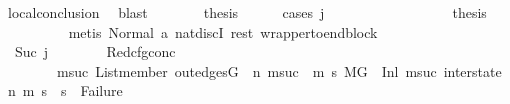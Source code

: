 \begin{isabellebody}
\ local{\isacharunderscore}{\kern0pt}conclusion\ \isamarkupfalse%
\ blast\isanewline
\ \ \ \ \isamarkupfalse%
\ \isamarkupfalse%
\ {\isacharquery}{\kern0pt}thesis\isanewline
\ \ \ \ \isamarkupfalse%
\ {\isacharparenleft}{\kern0pt}cases\ j{\isacharprime}{\kern0pt}{\isacharparenright}{\kern0pt}\isanewline
\ \ \ \ \ \ \isamarkupfalse%
\ {}\isanewline
\ \ \ \ \ \ \isamarkupfalse%
\ \isamarkupfalse%
\ {\isacharquery}{\kern0pt}thesis\ \isanewline
\ \ \ \ \ \ \ \ \isamarkupfalse%
\ {\isacharparenleft}{\kern0pt}metis\ Normal\ a{}\ nat{\isachardot}{\kern0pt}discI\ rest\ wrapper{\isacharunderscore}{\kern0pt}to{\isacharunderscore}{\kern0pt}endblock{\isacharparenright}{\kern0pt}\isanewline
\ \ \ \ \isamarkupfalse%
\isanewline
\ \ \ \ \ \ \isamarkupfalse%
\ {}{\isacharcolon}{\kern0pt}\ {\isacharparenleft}{\kern0pt}Suc\ j{\isacharprime}{\kern0pt}{\isacharprime}{\kern0pt}{\isacharparenright}{\kern0pt}\isanewline
\ \ \ \ \ \ \isamarkupfalse%
\ Red{\isacharunderscore}{\kern0pt}cfg{\isacharunderscore}{\kern0pt}conc{\isacharcolon}{\kern0pt}\ \isanewline
\ \ \ \ \ \ \ \ {\isachardoublequoteopen}{\isacharparenleft}{\kern0pt}{\isasymforall}msuc{}{\isachardot}{\kern0pt}\ List{\isachardot}{\kern0pt}member\ {\isacharparenleft}{\kern0pt}out{\isacharunderscore}{\kern0pt}edges{\isacharparenleft}{\kern0pt}G{\isacharparenright}{\kern0pt}\ {\isacharbang}{\kern0pt}\ n{\isacharparenright}{\kern0pt}\ msuc{}\ {\isasymlongrightarrow}\ {\isacharparenleft}{\kern0pt}{\isasymforall}m{}\ s{}{\isachardot}{\kern0pt}\ {\isacharparenleft}{\kern0pt}M{\isacharcomma}{\kern0pt}{\isasymLambda}{\isacharcomma}{\kern0pt}{\isasymGamma}{\isacharcomma}{\kern0pt}{\isasymOmega}{\isacharcomma}{\kern0pt}G\ {\isasymturnstile}\ {\isacharparenleft}{\kern0pt}Inl\ msuc{}{\isacharcomma}{\kern0pt}\ inter{\isacharunderscore}{\kern0pt}state{\isacharparenright}{\kern0pt}\ {\isacharminus}{\kern0pt}n{\isasymrightarrow}{\isacharasterisk}{\kern0pt}\ {\isacharparenleft}{\kern0pt}m{}{\isacharcomma}{\kern0pt}\ s{}{\isacharparenright}{\kern0pt}{\isacharparenright}{\kern0pt}\ {\isasymlongrightarrow}\ s{}\ {\isasymnoteq}\ Failure{\isacharparenright}{\kern0pt}{\isacharparenright}{\kern0pt}{\isachardoublequoteclose}\ \isanewline
\ \ \ \ \ \ \ \ \isamarkupfalse%

\end{isabellebody}
